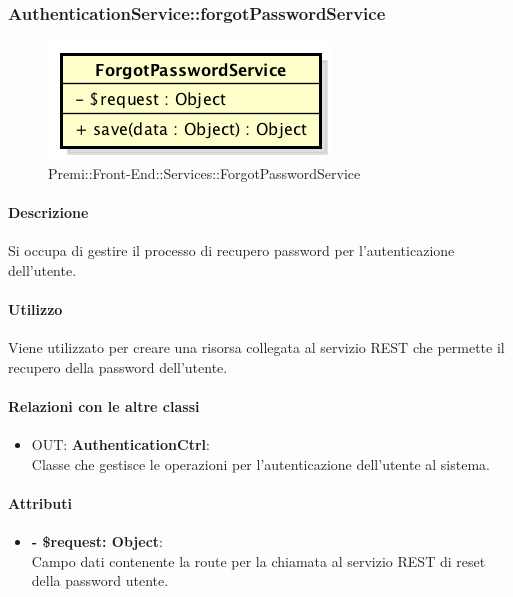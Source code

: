 		\subsubsection{AuthenticationService::forgotPasswordService}
		\begin{figure}[h]
			\centering
				\includegraphics[width=0.4\linewidth]{img/premi_front_end_services_forgotpasswordservice}
			\caption[Premi::Front-End::Services::ForgotPasswordService]{Premi::Front-End::Services::ForgotPasswordService}
		\end{figure}
		
		\paragraph{Descrizione}
		Si occupa di gestire il processo di recupero password per l'autenticazione dell'utente.
		
		\paragraph{Utilizzo}
		Viene utilizzato per creare una risorsa collegata al servizio \gls{REST} che permette il recupero della password dell'utente.
		
		\paragraph{Relazioni con le altre classi}
		\begin{itemize}
			\item OUT: \textbf{AuthenticationCtrl}:\\
			Classe che gestisce le operazioni per l'autenticazione dell'utente al sistema.
		\end{itemize}
		
		\paragraph{Attributi}
		\begin{itemize}
			\item \textbf{- \$request: Object}:\\
			Campo dati contenente la route per la chiamata al servizio \gls{REST} di reset della password utente.
		\end{itemize}	
		
